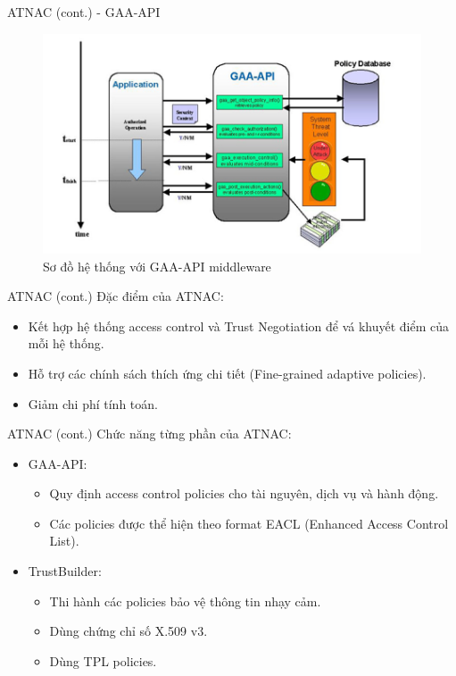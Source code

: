 \documentclass[11pt]{beamer}
\begin{document}
\begin{frame}{ATNAC (cont.) - GAA-API}
\begin{figure}
    \centering
    \includegraphics[scale=.5]{img/gaa-api.png}
    \caption{Sơ đồ hệ thống với GAA-API middleware}
    \label{fig:gaa_api}
\end{figure}
\end{frame}

\begin{frame}{ATNAC (cont.)}
Đặc điểm của ATNAC:
\begin{itemize}
\item Kết hợp hệ thống access control và Trust Negotiation để vá  khuyết điểm của mỗi hệ thống.
\item Hỗ trợ các chính sách thích ứng chi tiết (Fine-grained adaptive policies).
\item Giảm chi phí tính toán.
\end{itemize}
\end{frame}

\begin{frame}{ATNAC (cont.)}
Chức năng từng phần của ATNAC:
\begin{itemize}
\item GAA-API:
\begin{itemize}
\item Quy định access control policies cho tài nguyên, dịch vụ và hành động.
\item Các policies được thể hiện theo format EACL (Enhanced Access Control List).
\end{itemize}
\item TrustBuilder:
\begin{itemize}
\item Thi hành các policies bảo vệ thông tin nhạy cảm.
\item Dùng chứng chỉ số X.509 v3.
\item Dùng TPL policies.
\end{itemize}
\end{itemize}
\end{frame}
\end{document}
